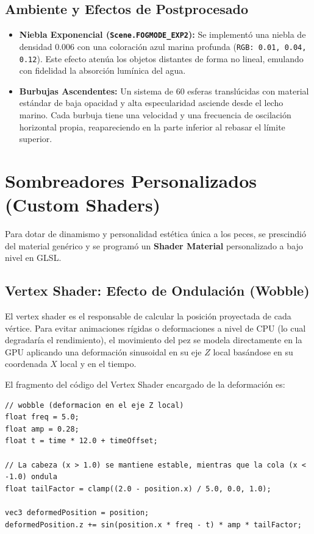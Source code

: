 \documentclass[12pt,a4paper]{article}
\begin{document}
\subsection{Ambiente y Efectos de Postprocesado}
\begin{itemize}
    \item \textbf{Niebla Exponencial (\texttt{Scene.FOGMODE\_EXP2}):} Se implementó una niebla de densidad $0.006$ con una coloración azul marina profunda (\texttt{RGB: 0.01, 0.04, 0.12}). Este efecto atenúa los objetos distantes de forma no lineal, emulando con fidelidad la absorción lumínica del agua.
    \item \textbf{Burbujas Ascendentes:} Un sistema de 60 esferas translúcidas con material estándar de baja opacidad y alta especularidad asciende desde el lecho marino. Cada burbuja tiene una velocidad y una frecuencia de oscilación horizontal propia, reapareciendo en la parte inferior al rebasar el límite superior.
\end{itemize}

\newpage
\section{Sombreadores Personalizados (Custom Shaders)}
Para dotar de dinamismo y personalidad estética única a los peces, se prescindió del material genérico y se programó un \textbf{Shader Material} personalizado a bajo nivel en GLSL.

\subsection{Vertex Shader: Efecto de Ondulación (Wobble)}
El vertex shader es el responsable de calcular la posición proyectada de cada vértice. Para evitar animaciones rígidas o deformaciones a nivel de CPU (lo cual degradaría el rendimiento), el movimiento del pez se modela directamente en la GPU aplicando una deformación sinusoidal en su eje $Z$ local basándose en su coordenada $X$ local y en el tiempo.

El fragmento del código del Vertex Shader encargado de la deformación es:
\begin{lstlisting}[style=glslstyle]
// wobble (deformacion en el eje Z local)
float freq = 5.0;
float amp = 0.28;
float t = time * 12.0 + timeOffset;

// La cabeza (x > 1.0) se mantiene estable, mientras que la cola (x < -1.0) ondula
float tailFactor = clamp((2.0 - position.x) / 5.0, 0.0, 1.0);

vec3 deformedPosition = position;
deformedPosition.z += sin(position.x * freq - t) * amp * tailFactor;
\end{lstlisting}
\end{document}
